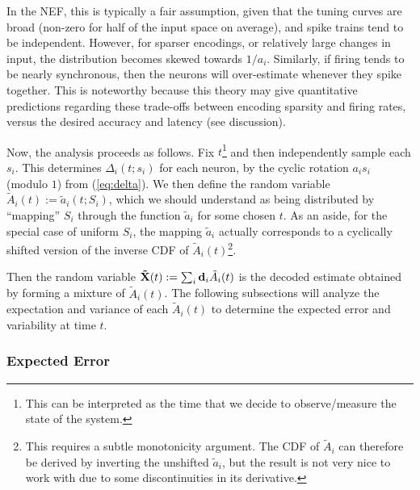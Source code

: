 In the NEF, this is typically a fair assumption, given that the tuning curves are broad (non-zero for half of the input space on average), and spike trains tend to be independent. However, for sparser encodings, or relatively large changes in input, the distribution becomes skewed towards $1 / a_i$. Similarly, if firing tends to be nearly synchronous, then the neurons will over-estimate whenever they spike together. This is noteworthy because this theory may give quantitative predictions regarding these trade-offs between encoding sparsity and firing rates, versus the desired accuracy and latency (see discussion).

Now, the analysis proceeds as follows. Fix $t$\footnote{This can be interpreted as the time that we decide to observe/measure the state of the system.} and then independently sample each $s_i$. This determines $\Delta_i(t; s_i)$ for each neuron, by the cyclic rotation $a_i s_i$ (modulo $1$) from (\ref{eq:delta}). We then define the random variable $\tilde{A}_i(t) := \tilde{a}_i(t; S_i)$, which we should understand as being distributed by ``mapping'' $S_i$ through the function $\tilde{a}_i$ for some chosen $t$. As an aside, for the special case of uniform $S_i$, the mapping $\tilde{a}_i$ actually corresponds to a cyclically shifted version of the inverse CDF of $\tilde{A}_i(t)$\footnote{This requires a subtle monotonicity argument. The CDF of $\tilde{A}_i$ can therefore be derived by inverting the unshifted $\tilde{a}_i$, but the result is not very nice to work with due to some discontinuities in its derivative.}.

Then the random variable $\mathbf{\tilde{X}}(t) := \sum_i \mathbf{d}_i \tilde{A}_i(t)$ is the decoded estimate obtained by forming a mixture of $\tilde{A}_i(t)$. The following subsections will analyze the expectation and variance of each $\tilde{A}_i(t)$ to determine the expected error and variability at time $t$.

\subsubsection{Expected Error}

